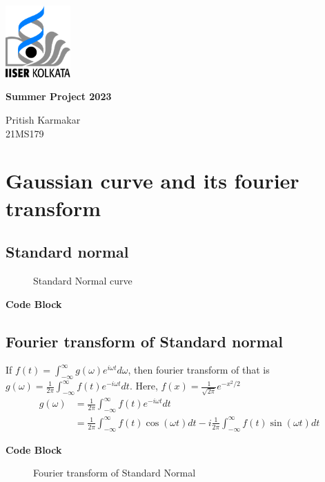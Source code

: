 \documentclass[11pt,a4paper]{article}
\author{Pritish Karmakar}
\begin{document}
	\begin{titlepage}
		\centering
		\includegraphics[width=2.5cm]{iiserk.png}
		
		\vspace{4cm}
		{\Huge\bfseries Summer Project 2023}
		
		\vspace{3cm}
		{\LARGE Pritish Karmakar\\}
		\vspace{0.3cm}
		{21MS179}
		\vfill
		
		
		\clearpage
		\tableofcontents
		\clearpage
		\listoffigures
		\listoftables
	\end{titlepage}
	
\section{Gaussian curve and its fourier transform}

\subsection{Standard normal}
	\begin{figure}[ht]
		\centering
		\scalebox{1.15}{}
		 \caption{Standard Normal curve}
		\label{fig:gaussian}
	\end{figure}


\noindent \dotfill \textbf{Code Block} \noindent\dotfill
%

\dotfill

\subsection{Fourier transform of Standard normal}
If $f(t)=\int_{-\infty}^{\infty}g(\omega)e^{i\omega t} d\omega$, then fourier transform of that is $g(\omega)=\frac{1}{2\pi}\int_{-\infty}^{\infty}f(t)e^{-i\omega t} dt$. Here, $f(x)=\frac{1}{\sqrt{2\pi}}e^{-x^2 /2}$\\

\begin{align*}
	g(\omega)&=\frac{1}{2\pi}\int_{-\infty}^{\infty}f(t)e^{-i\omega t} dt\\
	&=\frac{1}{2\pi}\int_{-\infty}^{\infty}f(t)\cos(\omega t) dt - i \frac{1}{2\pi}\int_{-\infty}^{\infty}f(t)\sin(\omega t) dt
\end{align*}

\noindent \dotfill \textbf{Code Block} \noindent\dotfill

\dotfill

\begin{figure}[ht]
	\centering
	\scalebox{1}{}
	\caption{Fourier transform of Standard Normal}
	\label{fig:fft_gaussian}
\end{figure}
\end{document}
